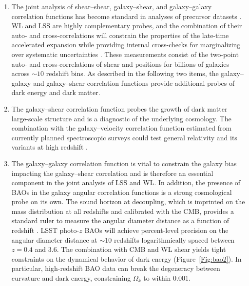 \begin{enumerate}

\item The
joint analysis of shear--shear, galaxy--shear, and galaxy--galaxy
correlation functions has become standard in analyses of precursor datasets
\cite[e.g.][]{2017arXiv170801530D,2018MNRAS.474.4894J}. WL and LSS are highly complementary probes, and the combination
of their auto- and cross-correlations will constrain the properties of the late-time accelerated expansion while providing
internal cross-checks for marginalizing over systematic uncertainties \cite[e.g.,][]{2018ARA&A..56..393M}.
These measurements consist of the two-point auto- and cross-correlations of shear and positions for billions of galaxies across $\sim 10$ redshift bins.
As described in the following two items, the galaxy--galaxy and galaxy--shear correlation functions provide additional probes of dark energy and dark matter.

\item The galaxy--shear correlation function probes the growth of dark matter large-scale structure and is a
diagnostic of the underlying cosmology. The combination with the
galaxy--velocity correlation function estimated from currently planned
spectroscopic surveys
could test general relativity and its variants at high redshift \citep{2010Natur.464..256R}.

\item The galaxy--galaxy correlation function is vital to constrain the galaxy bias impacting the galaxy--shear correlation and is therefore
an essential component in the joint analysis of LSS and WL. In addition, the presence of
BAOs in the galaxy angular correlation functions is a strong cosmological
probe on its own. The sound horizon at decoupling, which is imprinted on the
mass distribution at all redshifts and calibrated with the CMB, provides a standard ruler to measure the angular diameter
distance as a function of redshift
\citep{1998ApJ...504L..57E,2001ApJ...557L...7C,2003ApJ...594..665B,2003PhRvD..68f3004H,2003PhRvD..68h3504L,2003ApJ...598..720S}.
LSST photo-$z$ BAOs will achieve percent-level precision on the angular
diameter distance at $\sim$10 redshifts logarithmically spaced between $z = 0.4$ and 3.6. The combination with CMB
and WL shear yields tight constraints on the
dynamical behavior of dark energy (Figure~\ref{Fig:bao2}). In particular, high-redshift BAO data can break
the degeneracy between curvature and dark energy, constraining $\Omega_k$ to within
0.001.


\end{enumerate}
